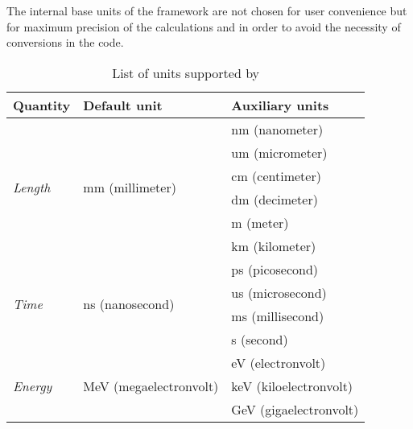 The internal base units of the framework are not chosen for user convenience but for maximum precision of the calculations and in order to avoid the necessity of conversions in the code.

\begin{table}[tbp]
\centering
\caption{List of units supported by \apsq}
\label{tab:units}
\begin{tabular}{|l|l|l|}
\hline
\textbf{Quantity}                 & \textbf{Default unit}                   & \textbf{Auxiliary units} \\ \hline
\multirow{6}{*}{\textit{Length}}  & \multirow{6}{*}{mm (millimeter)}        & nm (nanometer)           \\ \cline{3-3}
                                  &                                         & um (micrometer)          \\ \cline{3-3}
                                  &                                         & cm (centimeter)          \\ \cline{3-3}
                                  &                                         & dm (decimeter)           \\ \cline{3-3}
                                  &                                         & m (meter)                \\ \cline{3-3}
                                  &                                         & km (kilometer)           \\ \hline
\multirow{4}{*}{\textit{Time}}    & \multirow{4}{*}{ns (nanosecond)}        & ps (picosecond)          \\ \cline{3-3}
                                  &                                         & us (microsecond)         \\ \cline{3-3}
                                  &                                         & ms (millisecond)         \\ \cline{3-3}
                                  &                                         & s (second)               \\ \hline
\multirow{4}{*}{\textit{Energy}}  & \multirow{4}{*}{MeV (megaelectronvolt)} & eV (electronvolt)        \\ \cline{3-3}
                                  &                                         & keV (kiloelectronvolt)   \\ \cline{3-3}
                                  &                                         & GeV (gigaelectronvolt)   \\ \hline

\end{tabular}
\end{table}
